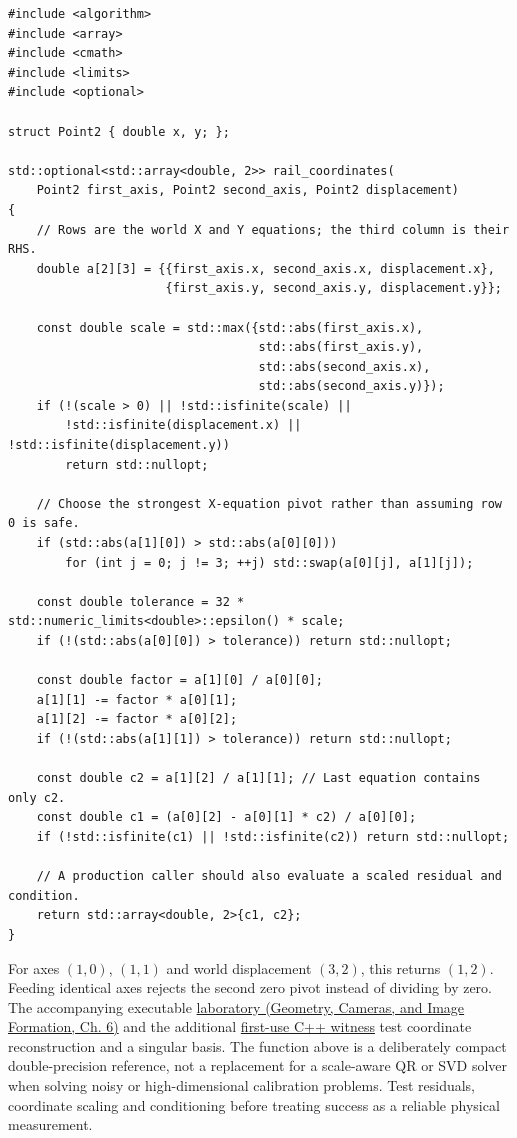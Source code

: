 \begin{verbatim}
#include <algorithm>
#include <array>
#include <cmath>
#include <limits>
#include <optional>

struct Point2 { double x, y; };

std::optional<std::array<double, 2>> rail_coordinates(
    Point2 first_axis, Point2 second_axis, Point2 displacement)
{
    // Rows are the world X and Y equations; the third column is their RHS.
    double a[2][3] = {{first_axis.x, second_axis.x, displacement.x},
                      {first_axis.y, second_axis.y, displacement.y}};

    const double scale = std::max({std::abs(first_axis.x),
                                   std::abs(first_axis.y),
                                   std::abs(second_axis.x),
                                   std::abs(second_axis.y)});
    if (!(scale > 0) || !std::isfinite(scale) ||
        !std::isfinite(displacement.x) || !std::isfinite(displacement.y))
        return std::nullopt;

    // Choose the strongest X-equation pivot rather than assuming row 0 is safe.
    if (std::abs(a[1][0]) > std::abs(a[0][0]))
        for (int j = 0; j != 3; ++j) std::swap(a[0][j], a[1][j]);

    const double tolerance = 32 * std::numeric_limits<double>::epsilon() * scale;
    if (!(std::abs(a[0][0]) > tolerance)) return std::nullopt;

    const double factor = a[1][0] / a[0][0];
    a[1][1] -= factor * a[0][1];
    a[1][2] -= factor * a[0][2];
    if (!(std::abs(a[1][1]) > tolerance)) return std::nullopt;

    const double c2 = a[1][2] / a[1][1]; // Last equation contains only c2.
    const double c1 = (a[0][2] - a[0][1] * c2) / a[0][0];
    if (!std::isfinite(c1) || !std::isfinite(c2)) return std::nullopt;

    // A production caller should also evaluate a scaled residual and condition.
    return std::array<double, 2>{c1, c2};
}
\end{verbatim}

For axes \((1,0)\), \((1,1)\) and world displacement \((3,2)\), this returns \((1,2)\). Feeding identical axes rejects the second zero pivot instead of dividing by zero. The accompanying executable \href{../03-Geometry-Cameras-and-Image-Formation/main.pdf\#nameddest=02-foundations-ii-ch037-a-complete-scalar-laboratory-makes-the-story-executable}{laboratory (Geometry, Cameras, and Image Formation, Ch. 6)} and the additional \hyperref[source-file-a41016f2e326b40cdff18ff4]{first-use C++ witness} test coordinate reconstruction and a singular basis. The function above is a deliberately compact double-precision reference, not a replacement for a scale-aware QR or SVD solver when solving noisy or high-dimensional calibration problems. Test residuals, coordinate scaling and conditioning before treating success as a reliable physical measurement.

